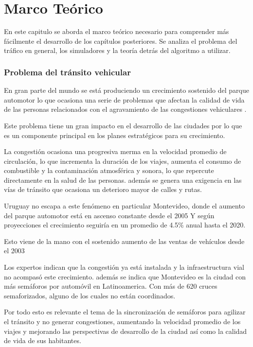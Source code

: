 \chapter{Marco Teórico}

 En este capitulo se aborda el marco teórico necesario para comprender más fácilmente el desarrollo de los capítulos posteriores. Se analiza el problema del tráfico en general, los simuladores y la teoría detrás del algoritmo a utilizar.

\subsection{Problema del tránsito vehicular}

En gran parte del mundo se está produciendo un crecimiento sostenido del parque automotor lo que ocasiona una serie de problemas que afectan la calidad de vida de las personas relacionados con el agravamiento de las congestiones vehiculares \citep{Cepal2003}.

Este problema tiene un gran impacto en el desarrollo de las ciudades por lo que es un componente principal en los planes estratégicos para su crecimiento.

La congestión ocasiona una progresiva merma en la velocidad promedio de circulación, lo que incrementa la duración de los viajes, aumenta el consumo de combustible y la contaminación atmosférica y sonora, lo que repercute directamente en la salud de las personas. 
además se genera una exigencia en las vías de tránsito que ocasiona un deterioro mayor de calles y rutas.

Uruguay no escapa a este fenómeno en particular Montevideo, donde el aumento del parque automotor está en ascenso constante desde el 2005 \citep{INE2014} 
Y según proyecciones el crecimiento seguiría en un promedio de 4.5\% anual hasta el 2020. \citep{BBVA2013}

Esto viene de la mano con el sostenido aumento de las ventas de vehículos  desde el 2003 \citep{Autoanuario2014}

Los expertos indican que la congestión ya está instalada y la infraestructura vial no acompasó este crecimiento. además se indica que Montevideo es la ciudad con más semáforos por automóvil en Latinoamerica. Con más de 620 cruces semaforizados, alguno de los cuales no están coordinados.\citep{Subrayado2013}

Por todo esto es relevante el tema de la sincronización de semáforos para agilizar el tránsito y no generar congestiones, aumentando la velocidad promedio de los viajes y mejorando las perspectivas de desarrollo de la ciudad así como la calidad de vida de sus habitantes.

